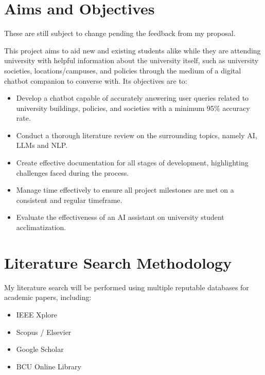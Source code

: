 \documentclass[12pt]{report}
\begin{document}
    \section{Aims and Objectives}

    \begin{tcolorbox}[colback=red!5!white,colframe=red!75!black,title=Copied from proposal]
        These are still subject to change pending the feedback from my proposal.
    \end{tcolorbox}

    \noindent
    This project aims to aid new and existing students alike while they are attending university with 
    helpful information about the university itself, such as university societies, locations/campuses, 
    and policies through the medium of a digital chatbot companion to converse with.
    Its objectives are to:

    \begin{itemize}
        \item Develop a chatbot capable of accurately answering user queries related to university 
        buildings, policies, and societies with a minimum 95\% accuracy rate.
        \item Conduct a thorough literature review on the surrounding topics, namely AI, LLMs and NLP.
        \item Create effective documentation for all stages of development, highlighting challenges faced during the process.
        \item Manage time effectively to ensure all project milestones are met on a consistent and regular timeframe.
        \item Evaluate the effectiveness of an AI assistant on university student acclimatization.
    \end{itemize}

    \pagebreak %

    \section{Literature Search Methodology}

    \noindent 
    My literature search will be performed using multiple reputable databases for academic papers, including:
    \begin{itemize}
        \item IEEE Xplore
        \item Scopus / Elsevier
        \item Google Scholar
        \item BCU Online Library
    \end{itemize}
    
\end{document}
